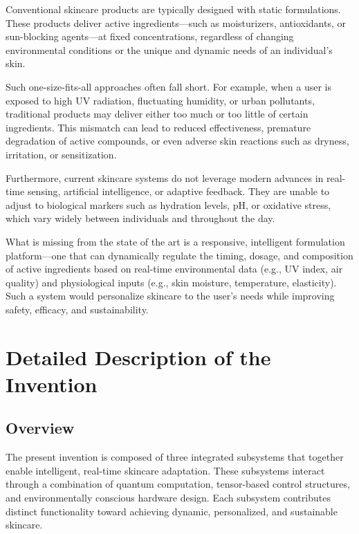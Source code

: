 \documentclass{article}
\theoremstyle{plain}
\theoremstyle{claimstyle}
\begin{document}
Conventional skincare products are typically designed with static formulations. These products deliver active ingredients—such as moisturizers, antioxidants, or sun-blocking agents—at fixed concentrations, regardless of changing environmental conditions or the unique and dynamic needs of an individual's skin.

Such one-size-fits-all approaches often fall short. For example, when a user is exposed to high UV radiation, fluctuating humidity, or urban pollutants, traditional products may deliver either too much or too little of certain ingredients. This mismatch can lead to reduced effectiveness, premature degradation of active compounds, or even adverse skin reactions such as dryness, irritation, or sensitization.

Furthermore, current skincare systems do not leverage modern advances in real-time sensing, artificial intelligence, or adaptive feedback. They are unable to adjust to biological markers such as hydration levels, pH, or oxidative stress, which vary widely between individuals and throughout the day.

What is missing from the state of the art is a responsive, intelligent formulation platform—one that can dynamically regulate the timing, dosage, and composition of active ingredients based on real-time environmental data (e.g., UV index, air quality) and physiological inputs (e.g., skin moisture, temperature, elasticity). Such a system would personalize skincare to the user’s needs while improving safety, efficacy, and sustainability.

\section{Detailed Description of the Invention}

\subsection{Overview}

The present invention is composed of three integrated subsystems that together enable intelligent, real-time skincare adaptation. These subsystems interact through a combination of quantum computation, tensor-based control structures, and environmentally conscious hardware design. Each subsystem contributes distinct functionality toward achieving dynamic, personalized, and sustainable skincare.
\end{document}
